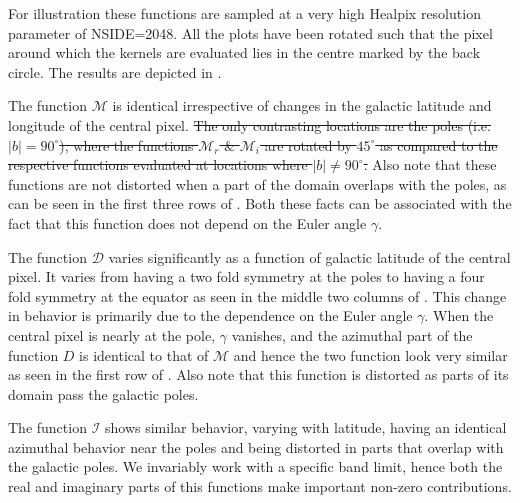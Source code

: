 %
 For illustration these functions are sampled at a very high Healpix resolution parameter of NSIDE=2048. All the plots have been rotated such that the pixel around which the kernels are evaluated lies in the centre marked by the back circle. The results are depicted in . 

The function $\mathcal{M}$ is identical irrespective of changes in the galactic latitude and longitude of the central pixel. \st{The only contrasting locations are the poles (i.e. $|b|=90^{\circ}$), where the functions $\mathcal{M}_r$ \& $\mathcal{M}_i$ are rotated by $45^{\circ}$  as compared to the respective functions evaluated at locations where $|b|\neq 90^{\circ}$.} Also note that these functions are not distorted when a part of the domain overlaps with the poles, as can be seen in the first three rows of . Both these facts can be associated with the fact that this function does not depend on the Euler angle $\gamma$. 

The function $\mathcal{D}$ varies significantly as a function of galactic latitude of the central pixel. It varies from having a two fold symmetry at the poles to having a four fold symmetry at the equator as seen in the middle two columns of . This change in behavior is primarily due to the  dependence on the Euler angle $\gamma$. When the central pixel is nearly at the pole, $\gamma$ vanishes, and the azimuthal part of the function $D$ is identical to that of $\mathcal{M}$ and hence the two function look very similar as seen in the first row of . Also note that this function is distorted as parts of its domain pass the galactic poles.  

The function $\mathcal{I}$ shows similar behavior, varying with latitude, having an identical azimuthal behavior near the poles and being distorted in parts that overlap with the galactic poles.   We invariably work with a specific band limit, hence both the real and imaginary parts of this functions make important non-zero contributions. 

